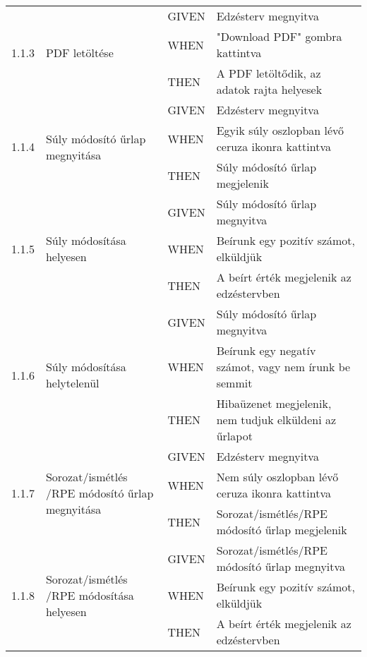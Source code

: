 \begin{center}
\begin{longtable}{ | p{} | p{} | p{} | p{} | }
			\multirow{3}{*}{1.1.3} 
			& \multirow{3}{=}{PDF letöltése} 
			& GIVEN 
			& Edzésterv megnyitva \\
			\cline{3-4}
			& & WHEN 
			& "Download PDF" gombra kattintva \\
			\cline{3-4}
			& & THEN 
			& A PDF letöltődik, az adatok rajta helyesek \\
			\hline

			\multirow{3}{*}{1.1.4} 
			& \multirow{3}{=}{Súly módosító űrlap megnyitása} 
			& GIVEN 
			& Edzésterv megnyitva \\
			\cline{3-4}
			& & WHEN 
			& Egyik súly oszlopban lévő ceruza ikonra kattintva \\
			\cline{3-4}
			& & THEN 
			& Súly módosító űrlap megjelenik \\
			\hline

			\multirow{3}{*}{1.1.5} 
			& \multirow{3}{=}{Súly módosítása helyesen} 
			& GIVEN 
			& Súly módosító űrlap megnyitva \\
			\cline{3-4}
			& & WHEN 
			& Beírunk egy pozitív számot, elküldjük \\
			\cline{3-4}
			& & THEN 
			& A beírt érték megjelenik az edzéstervben \\
			\hline

			\multirow{3}{*}{1.1.6} 
			& \multirow{3}{=}{Súly módosítása helytelenül} 
			& GIVEN 
			& Súly módosító űrlap megnyitva \\
			\cline{3-4}
			& & WHEN 
			& Beírunk egy negatív számot, vagy nem írunk be semmit \\
			\cline{3-4}
			& & THEN 
			& Hibaüzenet megjelenik, nem tudjuk elküldeni az űrlapot \\
			\hline

			\multirow{3}{*}{1.1.7} 
			& \multirow{3}{=}{Sorozat/ismétlés /RPE módosító űrlap megnyitása} 
			& GIVEN 
			& Edzésterv megnyitva \\
			\cline{3-4}
			& & WHEN 
			& Nem súly oszlopban lévő ceruza ikonra kattintva \\
			\cline{3-4}
			& & THEN 
			& Sorozat/ismétlés/RPE módosító űrlap megjelenik \\
			\hline

			\multirow{3}{*}{1.1.8} 
			& \multirow{3}{=}{Sorozat/ismétlés /RPE módosítása helyesen} 
			& GIVEN 
			& Sorozat/ismétlés/RPE módosító űrlap megnyitva \\
			\cline{3-4}
			& & WHEN 
			& Beírunk egy pozitív számot, elküldjük \\
			\cline{3-4}
			& & THEN 
			& A beírt érték megjelenik az edzéstervben \\
			\hline


\end{longtable}
\end{center}
